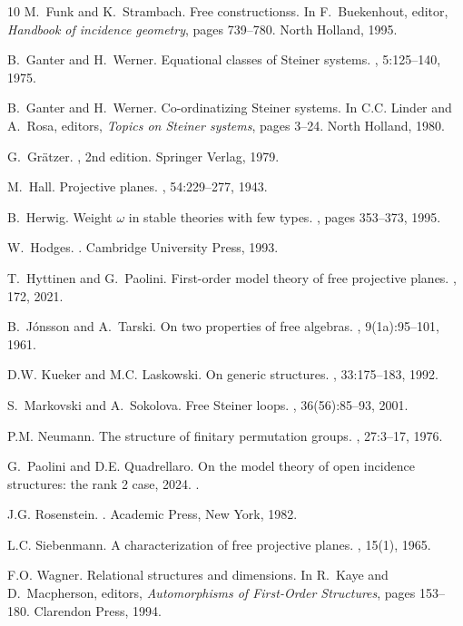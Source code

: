 \documentclass[a4paper, 11pt]{article}
\theoremstyle{note}
\begin{document}
\begin{thebibliography}{10}
M.~Funk and K.~Strambach.
\newblock Free constructionss.
\newblock In F.~Buekenhout, editor, {\em Handbook of incidence geometry}, pages
  739--780. North Holland, 1995.

B.~Ganter and H.~Werner.
\newblock Equational classes of {S}teiner systems.
, 5:125--140, 1975.

B.~Ganter and H.~Werner.
\newblock Co-ordinatizing {S}teiner systems.
\newblock In C.C. Linder and A.~Rosa, editors, {\em Topics on {S}teiner
  systems}, pages 3--24. North Holland, 1980.

G.~Gr\"atzer.
, 2nd edition.
\newblock Springer Verlag, 1979.

M.~Hall.
\newblock Projective planes.
, 54:229--277, 1943.

B.~Herwig.
\newblock Weight $\omega$ in stable theories with few types.
, pages 353--373, 1995.

W.~Hodges.
.
\newblock Cambridge University Press, 1993.

T.~Hyttinen and G.~Paolini.
\newblock First-order model theory of free projective planes.
, 172, 2021.

B.~J\'onsson and A.~Tarski.
\newblock On two properties of free algebras.
, 9(1a):95--101, 1961.

D.W. Kueker and M.C. Laskowski.
\newblock On generic structures.
, 33:175--183, 1992.

S.~Markovski and A.~Sokolova.
\newblock Free {S}teiner loops.
, 36(56):85--93, 2001.

P.M. Neumann.
\newblock The structure of finitary permutation groups.
, 27:3--17, 1976.

G.~Paolini and D.E. Quadrellaro.
\newblock On the model theory of open incidence structures: the rank 2 case,
  2024.
.

J.G. Rosenstein.
.
\newblock Academic Press, New York, 1982.

L.C. Siebenmann.
\newblock A characterization of free projective planes.
, 15(1), 1965.

F.O. Wagner.
\newblock Relational structures and dimensions.
\newblock In R.~Kaye and D.~Macpherson, editors, {\em Automorphisms of
  First-Order Structures}, pages 153--180. Clarendon Press, 1994.

\end{thebibliography}
\end{document}
